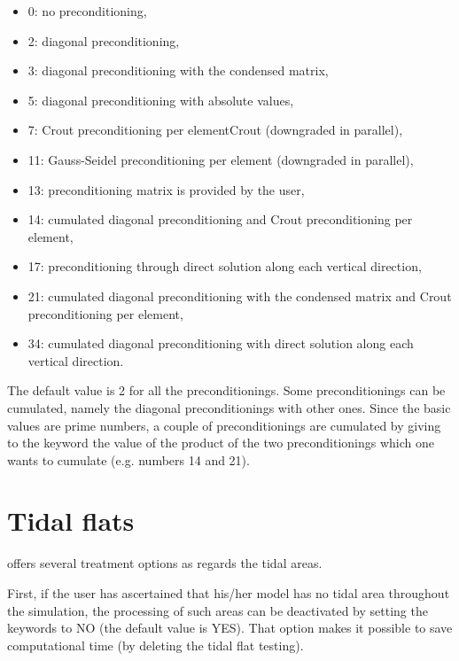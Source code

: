\begin{itemize}
\item 0:  no preconditioning,

\item 2:  diagonal preconditioning,

\item 3:  diagonal preconditioning with the condensed matrix,

\item 5:  diagonal preconditioning with absolute values,

\item 7:  Crout preconditioning per elementCrout (downgraded in parallel),

\item 11: Gauss-Seidel preconditioning per element (downgraded in parallel),

\item 13: preconditioning matrix is provided by the user,

\item 14: cumulated diagonal preconditioning and Crout preconditioning per
element,

\item 17:  preconditioning through direct solution along each vertical
direction,

\item 21:  cumulated diagonal preconditioning with the condensed matrix and
Crout preconditioning per element,

\item 34:  cumulated diagonal preconditioning with direct solution along each
vertical direction.
\end{itemize}

The default value is 2 for all the preconditionings. Some preconditionings can
be cumulated, namely the diagonal preconditionings with other ones. Since the
basic values are prime numbers, a couple of preconditionings are cumulated by
giving to the keyword the value of the product of the two preconditionings
which one wants to cumulate (e.g. numbers 14 and 21).

\section{Tidal flats}

 offers several treatment options as regards the tidal areas.

First, if the user has ascertained that his/her model has no tidal area
throughout the simulation, the processing of such areas can be deactivated by
setting the keywords  to NO (the default value is YES).
That option makes it possible to save computational time (by deleting the tidal
flat testing).

